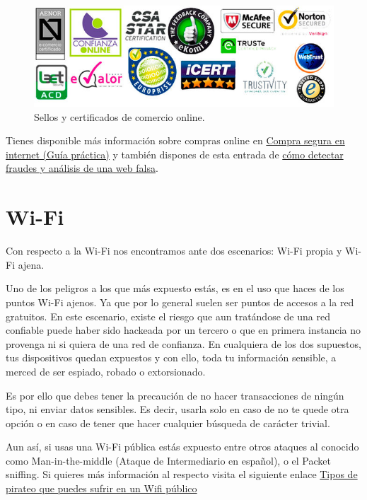 \documentclass[
  spanish,
  a4paper,
  openany]{book}
\begin{document}
\begin{figure}

{\centering \includegraphics[width=0.75\linewidth]{images/sellos-de-confianza-online} 

}

\caption{Sellos y certificados de comercio online.}\label{fig:unnamed-chunk-11}
\end{figure}

Tienes disponible más información sobre compras online en \href{https://www.aepd.es/sites/default/files/2019-09/guia-compra-segura-digital-web.pdf}{Compra segura en internet (Guía práctica)} y también dispones de esta entrada de \href{https://www.osi.es/es/actualidad/blog/2018/08/08/detectando-fraudes-analisis-de-una-web-de-venta-falsa}{cómo detectar fraudes y análisis de una web falsa}.

\hypertarget{wi-fi}{%
\section{Wi-Fi}\label{wi-fi}}

Con respecto a la Wi-Fi nos encontramos ante dos escenarios: Wi-Fi propia y Wi-Fi ajena.

Uno de los peligros a los que más expuesto estás, es en el uso que haces de los puntos Wi-Fi ajenos. Ya que por lo general suelen ser puntos de accesos a la red gratuitos. En este escenario, existe el riesgo que aun tratándose de una red confiable puede haber sido hackeada por un tercero o que en primera instancia no provenga ni si quiera de una red de confianza. En cualquiera de los dos supuestos, tus dispositivos quedan expuestos y con ello, toda tu información sensible, a merced de ser espiado, robado o extorsionado.

Es por ello que debes tener la precaución de no hacer transacciones de ningún tipo, ni enviar datos sensibles. Es decir, usarla solo en caso de no te quede otra opción o en caso de tener que hacer cualquier búsqueda de carácter trivial.

Aun así, si usas una Wi-Fi pública estás expuesto entre otros ataques al conocido como Man-in-the-middle (Ataque de Intermediario en español), o el Packet sniffing. Si quieres más información al respecto visita el siguiente enlace \href{https://as.com/meristation/2020/02/04/betech/1580856719_548183.html}{Tipos de pirateo que puedes sufrir en un Wifi público}
\end{document}
